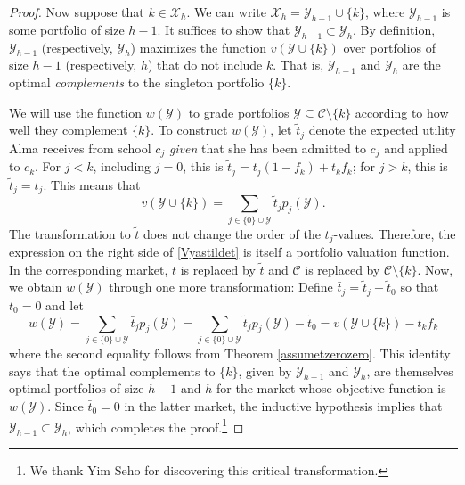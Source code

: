 \documentclass[12pt]{article} %
\theoremstyle{definition}
\theoremstyle{definition}
\begin{document}
\begin{proof}
Now suppose that $k \in \mathcal{X}_h$. We can write $\mathcal{X}_h = \mathcal{Y}_{h-1} \cup \{k\}$, where $ \mathcal{Y}_{h-1}$ is some portfolio of size $h-1$. It suffices to show that $ \mathcal{Y}_{h-1} \subset \mathcal{Y}_h$. By definition, $\mathcal{Y}_{h-1}$ (respectively, $\mathcal{Y}_{h}$) maximizes the function $v(\mathcal{Y}\cup\{k\})$ over portfolios of size $h-1$ (respectively, $h$) that do not include $k$. That is, $\mathcal{Y}_{h-1}$ and $\mathcal{Y}_h$ are the optimal \emph{complements} to the singleton portfolio $\{k\}$.

We will use the function $w(\mathcal{Y})$ to grade portfolios $\mathcal{Y} \subseteq \mathcal{C} \setminus \{k\}$ according to how well they complement $\{k\}$. To construct $w(\mathcal{Y})$, let $\tilde t_j$ denote the expected utility Alma receives from school $c_j$ \emph{given} that she has been admitted to $c_j$ and applied to $c_k$. For $j < k$, including $j = 0$, this is $\tilde t_j = t_j (1- f_k) + t_k f_k$; for $j > k $, this is $\tilde t_j = t_j$. This means that 
\begin{equation}\label{Vyastildet}
v(\mathcal{Y}\cup\{k\}) = \sum_{j \in \{0\} \cup \mathcal{Y}} \tilde t_j p_j(\mathcal{Y}).\end{equation}
The transformation to $\tilde t$ does not change the order of the $t_j$-values. Therefore, the expression on the right side of \eqref{Vyastildet} is itself a portfolio valuation function. In the corresponding market, $t$ is replaced by $\tilde t$ and $\mathcal{C}$ is replaced by $\mathcal{C}\setminus\{k\}$. Now, we obtain $w(\mathcal{Y})$ through one more transformation: Define $\bar t_j = \tilde t_j - \tilde t_0$ so that $t_0 = 0$ and let
\begin{equation}  \label{wYvXminusconst}
w(\mathcal{Y})
= \sum_{j \in \{0\} \cup \mathcal{Y}} \bar t_j p_j(\mathcal{Y})
= \sum_{j \in \{0\} \cup \mathcal{Y}} \tilde t_j p_j(\mathcal{Y})- \tilde t_0
= v(\mathcal{Y}\cup\{k\}) -  t_k f_k \end{equation}
where the second equality follows from Theorem \ref{assumetzerozero}. This identity says that the optimal complements to $\{k\}$, given by $\mathcal{Y}_{h-1}$ and $\mathcal{Y}_h$, are themselves optimal portfolios of size $h-1$ and $h$ for the market whose objective function is $w(\mathcal{Y})$. Since $\bar t_0 = 0$ in the latter market, the inductive hypothesis implies that $\mathcal{Y}_{h-1} \subset \mathcal{Y}_h$, which completes the proof.\footnote{We thank Yim Seho for discovering this critical transformation.}
\end{proof}
\end{document}
